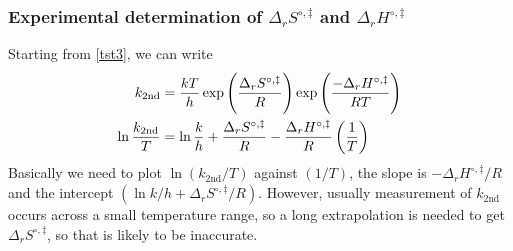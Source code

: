 \subsubsection{Experimental determination of \texorpdfstring{$\Delta_rS^{\circ,\ddag}$}{delta S} and \texorpdfstring{$\Delta_rH^{\circ,\ddag}$}{delta H}}
Starting from \cref{tst3}, we can write
\begin{equation}
\begin{aligned}
  k_{\text{2nd}}&=\frac{kT}{h}\exp \left(\frac{\Delta_rS^{\circ,\ddag}}{R} \right)\exp \left(\frac{-\Delta_rH^{\circ,\ddag}}{RT} \right)\\
  \ln\frac{k_{\text{2nd}}}{T}&=\ln\frac{k}{h}+\frac{\Delta_rS^{\circ,\ddag}}{R}-\frac{\Delta_rH^{\circ,\ddag}}{R}\left(\frac{1}{T} \right)
\end{aligned}
\end{equation}
Basically we need to plot $\ln(k_{\text{2nd}}/T)$ against $(1/T)$, the slope is $-\Delta_rH^{\circ,\ddag}/R$ and the intercept $(\ln k/h+\Delta_rS^{\circ,\ddag}/R) $. However, usually measurement of $k_{\text{2nd}}$ occurs across a small temperature range, so a long extrapolation is needed to get $\Delta_rS^{\circ,\ddag}$, so that is likely to be inaccurate.

